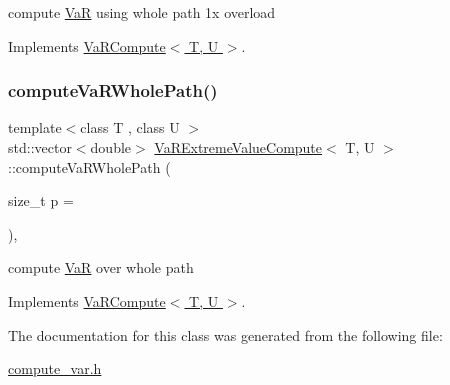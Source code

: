 compute \hyperlink{classVaR}{VaR} using whole path 1x overload 



Implements \hyperlink{classVaRCompute_a0465221010d248238fe1052958776984}{Va\+R\+Compute$<$ T, U $>$}.

\hypertarget{classVaRExtremeValueCompute_ad3b7ec9abcd6f6b27c89cf77e0099d18}{}\label{classVaRExtremeValueCompute_ad3b7ec9abcd6f6b27c89cf77e0099d18} 
\subsubsection{\texorpdfstring{compute\+Va\+R\+Whole\+Path()}{computeVaRWholePath()}}
{\footnotesize\ttfamily template$<$class T , class U $>$ \\
std\+::vector$<$double$>$ \hyperlink{classVaRExtremeValueCompute}{Va\+R\+Extreme\+Value\+Compute}$<$ T, U $>$\+::compute\+Va\+R\+Whole\+Path (\begin{DoxyParamCaption}\item[{size\+\_\+t}]{p = {} }\end{DoxyParamCaption})\hspace{0.3cm}{\ttfamily [inline]}, {\ttfamily [virtual]}}



compute \hyperlink{classVaR}{VaR} over whole path 



Implements \hyperlink{classVaRCompute_ad5ec9feb42ea2f99f2c91e793d18fe1b}{Va\+R\+Compute$<$ T, U $>$}.



The documentation for this class was generated from the following file\+:\begin{DoxyCompactItemize}
\item 
\hyperlink{compute__var_8h}{compute\+\_\+var.\+h}\end{DoxyCompactItemize}
